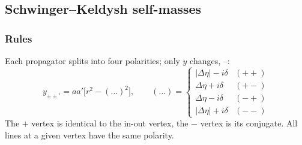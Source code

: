 \subsection{Schwinger--Keldysh self-masses}
\label{sec:t18-sk}

\subsubsection{Rules}
\tP{} Each propagator splits into four polarities; only $y$ changes, --:
\begin{equation}
y_{\pm\pm'}=aa'\big[r^2-(\ldots)^2\big],\qquad
(\ldots)=\begin{cases}
|\Delta\eta|-i\delta & (++)\\
\Delta\eta+i\delta & (+-)\\
\Delta\eta-i\delta & (-+)\\
|\Delta\eta|+i\delta & (--)
\end{cases}
\label{eq:ch09-ypol}
\end{equation}
The $+$ vertex is identical to the in-out vertex, the $-$ vertex is its conjugate. All lines at a given vertex have the same polarity.

